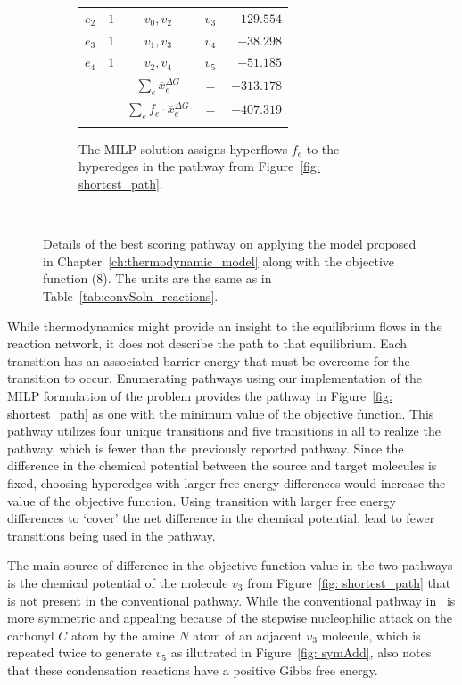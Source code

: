 \begin{figure}[!t]
\begin{subfigure}{\textwidth}
\begin{footnotesize}
\begin{tabular}{ccccr}
		    $e_2$ & $1$ & $v_0, v_2$ & $v_3$ & $-129.554$ \\
		    $e_3$ & $1$ & $v_1, v_3$ & $v_4$ & $-38.298$ \\
		    $e_4$ & $1$ & $v_2, v_4$ & $v_5$ & $-51.185$ \\
		    \midrule
		    & & $\sum_e \overline{x}^{\Delta G}_e$ & $=$ & $-313.178$ \\
		    & & $\sum_e f_e\cdot \overline{x}^{\Delta G}_e$ & $=$ & $-407.319$ \\
		    \bottomrule\\
		\end{tabular}
		\end{footnotesize}
		\caption{The MILP solution assigns hyperflows $f_e$ to the hyperedges in the pathway from Figure~\ref{fig: shortest_path}.}
		\label{tab:shortestSoln_reactions}
    \end{subfigure}\\
    \vspace{0.5cm}
    \caption{Details of the best scoring pathway on applying the model proposed in Chapter~\ref{ch:thermodynamic_model} along with the objective function (8). The units are the same as in Table~\ref{tab:convSoln_reactions}.}
\end{figure}

While thermodynamics might provide an insight to the equilibrium flows in the reaction network,
it does not describe the path to that equilibrium.
Each transition has an associated barrier energy that must be overcome for the transition to occur.
Enumerating pathways using our implementation of the MILP formulation of the problem provides the pathway in Figure~\ref{fig: shortest_path} as one with the minimum value of the objective function.
This pathway utilizes four unique transitions and five transitions in all to realize the pathway,
which is fewer than the previously reported pathway.
Since the difference in the chemical potential between the source and target molecules is fixed,
choosing hyperedges with larger free energy differences would increase the value of the objective function.
Using transition with larger free energy differences to `cover' the net difference in the chemical potential,
lead to fewer transitions being used in the pathway. 

The main source of difference in the objective function value in the two pathways is the chemical potential of the molecule $v_3$ from Figure~\ref{fig: shortest_path} that is not present in the conventional pathway.
While the conventional pathway in~\cite{implemented_CRN} is more symmetric and appealing because of the stepwise nucleophilic attack on the carbonyl $C$ atom by the amine $N$ atom of an adjacent $v_3$ molecule, which is repeated twice to generate $v_5$ as illutrated in Figure~\ref{fig: symAdd}, \cite{implemented_CRN} also notes that these condensation reactions have a positive Gibbs free energy.

